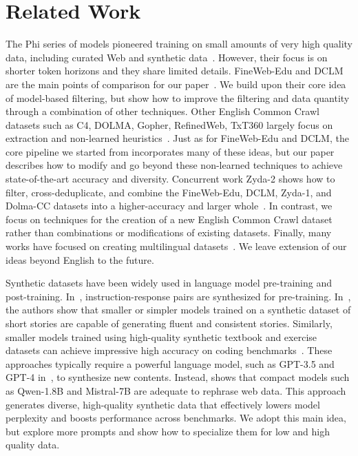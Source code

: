 \documentclass[11pt]{article}
\newcommand{\DCLM}{\textsc{DCLM}\xspace}
\begin{document}
\section{Related Work}
The Phi series of models pioneered training on small amounts of very high quality data, including curated Web and synthetic data~\citep{gunasekar2023textbooks,li2023textbooks,abdin2024phi}. However, their focus is on shorter token horizons and they share limited details. FineWeb-Edu and \DCLM are the main points of comparison for our paper~\citep{li2024datacomp,penedo2024fineweb}. We build upon their core idea of model-based filtering, but show how to improve the filtering and data quantity through a combination of other techniques. Other English Common Crawl datasets such as C4, DOLMA, Gopher, RefinedWeb, TxT360 largely focus on extraction and non-learned heuristics~\citep{penedo2023refinedweb,soldaini2024dolma,rae2021scaling,raffel2020exploring,txt360data2024}. Just as for FineWeb-Edu and \DCLM, the core pipeline we started from incorporates many of these ideas, but our paper describes how to modify and go beyond these non-learned techniques to achieve state-of-the-art accuracy and diversity. Concurrent work Zyda-2 shows how to filter, cross-deduplicate, and combine the FineWeb-Edu, \DCLM, Zyda-1, and Dolma-CC datasets into a higher-accuracy and larger whole~\citep{tokpanov2024zyda25trilliontoken}. In contrast, we focus on techniques for the creation of a new English Common Crawl dataset rather than combinations or modifications of existing datasets. Finally, many works have focused on creating multilingual datasets~\citep{xue-etal-2021-mt5,brack-etal-2024-community,abadji-etal-2022-towards,wenzek-etal-2020-ccnet,kudugunta2023madlad400multilingualdocumentlevellarge}. We leave extension of our ideas beyond English to the future.

Synthetic datasets have been widely used in language model pre-training and post-training. In~\citep{cheng2024instructionpretraininglanguagemodels}, instruction-response pairs are synthesized for pre-training.
In~\citep{eldan2023tinystories}, the authors show that smaller or simpler models trained on a synthetic dataset of short stories are capable of generating fluent and consistent stories. Similarly, smaller models trained using high-quality synthetic textbook and exercise datasets can achieve impressive high accuracy on coding benchmarks~\citep{gunasekar2023textbooks,li2023textbooks}.
These approaches typically require a powerful language model, such as GPT-3.5 and GPT-4 in~\citep{eldan2023tinystories}, to synthesize new contents.
Instead, \citep{maini2024rephrasing} shows that compact models such as Qwen-1.8B and Mistral-7B are adequate to rephrase web data. This approach generates diverse, high-quality synthetic data that effectively lowers model perplexity and boosts performance across benchmarks.
We adopt this main idea, but explore more prompts and show how to specialize them for low and high quality data.
\end{document}
